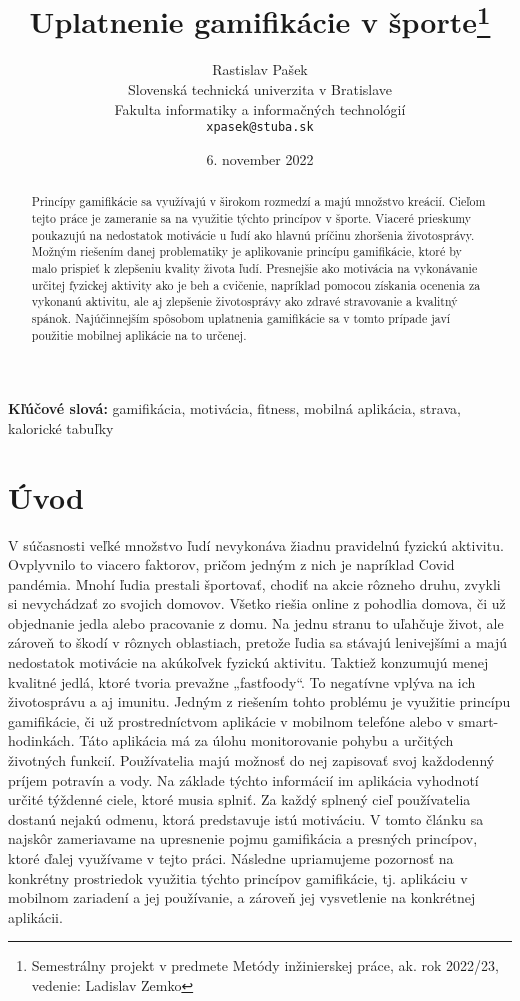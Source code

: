 \documentclass[10pt,twoside,slovak,a4paper]{article}
\title{Uplatnenie gamifikácie v športe\thanks{Semestrálny projekt v predmete Metódy inžinierskej práce, ak. rok 2022/23, vedenie: Ladislav Zemko}} %
\author{Rastislav Pašek\\[2pt]
	{\small Slovenská technická univerzita v Bratislave}\\
	{\small Fakulta informatiky a informačných technológií}\\
	{\small \texttt{xpasek@stuba.sk}}
	}
\date{\small 6. november 2022} %
\begin{document}
\maketitle

\begin{abstract}
Princípy gamifikácie sa využívajú v širokom rozmedzí a majú množstvo kreácií. Cieľom tejto práce je zameranie sa na využitie týchto princípov v športe. Viaceré prieskumy poukazujú na nedostatok motivácie u ľudí ako hlavnú príčinu zhoršenia životosprávy. Možným riešením danej problematiky je aplikovanie princípu gamifikácie, ktoré by malo prispieť k zlepšeniu kvality života ľudí. Presnejšie ako motivácia na vykonávanie určitej fyzickej aktivity ako je beh a cvičenie, napríklad pomocou získania ocenenia za vykonanú aktivitu, ale aj zlepšenie životosprávy ako zdravé stravovanie a kvalitný spánok. Najúčinnejším spôsobom uplatnenia gamifikácie sa v tomto prípade javí použitie mobilnej aplikácie na to určenej.
\end{abstract}



\textbf {Kľúčové slová:} gamifikácia, motivácia, fitness, mobilná aplikácia, strava, kalorické tabuľky



\section{Úvod}

	V súčasnosti veľké množstvo ľudí nevykonáva žiadnu pravidelnú fyzickú aktivitu. Ovplyvnilo to viacero faktorov, pričom jedným z nich je napríklad Covid pandémia. Mnohí ľudia prestali športovať, chodiť na akcie rôzneho druhu, zvykli si nevychádzať zo svojich domovov. Všetko riešia online z pohodlia domova, či už objednanie jedla alebo pracovanie z domu. Na jednu stranu to uľahčuje život, ale zároveň to škodí v rôznych oblastiach, pretože ľudia sa stávajú lenivejšími a majú nedostatok motivácie na akúkoľvek fyzickú aktivitu. Taktiež konzumujú menej kvalitné jedlá, ktoré tvoria prevažne „fastfoody“. To negatívne vplýva na ich životosprávu a aj imunitu. 
	Jedným z riešením tohto problému je využitie princípu gamifikácie, či už prostredníctvom aplikácie v mobilnom telefóne alebo v smart-hodinkách. Táto aplikácia má za úlohu monitorovanie pohybu a určitých životných funkcií. Používatelia majú možnosť do nej zapisovať svoj každodenný príjem potravín a vody. Na základe týchto informácií im aplikácia vyhodnotí určité týždenné ciele, ktoré musia splniť. Za každý splnený cieľ používatelia dostanú nejakú odmenu, ktorá predstavuje istú motiváciu. 
	V tomto článku sa najskôr zameriavame na upresnenie pojmu gamifikácia a presných princípov, ktoré ďalej využívame v tejto práci. Následne upriamujeme pozornosť na konkrétny prostriedok využitia týchto princípov gamifikácie, tj. aplikáciu v mobilnom zariadení a jej používanie, a zároveň jej vysvetlenie na konkrétnej aplikácii.
\end{document}
